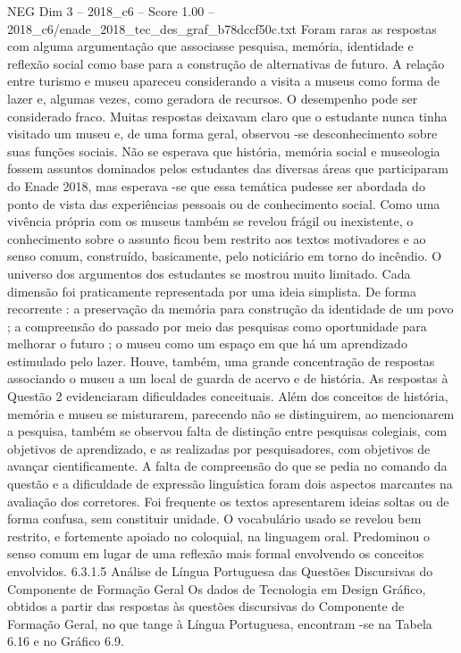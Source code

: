\begin{textsample}{NEG Dim 3 – 2018\_c6 – Score 1.00 – 2018\_c6/enade\_2018\_tec\_des\_graf\_b78dccf50c.txt}
Foram raras as respostas com alguma argumentação que associasse pesquisa, memória, identidade e reflexão social como base para a construção de alternativas de futuro.
A relação entre turismo e museu apareceu considerando a visita a museus como forma de lazer e, algumas vezes, como geradora de recursos.
O desempenho pode ser considerado fraco.
Muitas respostas deixavam claro que o estudante nunca tinha visitado um museu e, de uma forma geral, observou -se desconhecimento sobre suas funções sociais.
Não se esperava que história, memória social e museologia fossem assuntos dominados pelos estudantes das diversas áreas que participaram do Enade 2018, mas esperava -se que essa temática pudesse ser abordada do ponto de vista das experiências pessoais ou de conhecimento social.
Como uma vivência própria com os museus também se revelou frágil ou inexistente, o conhecimento sobre o assunto ficou bem restrito aos textos motivadores e ao senso comum, construído, basicamente, pelo noticiário em torno do incêndio.
O universo dos argumentos dos estudantes se mostrou muito limitado.
Cada dimensão foi praticamente representada por uma ideia simplista.
De forma recorrente : a preservação da memória para construção da identidade de um povo ; a compreensão do passado por meio das pesquisas como oportunidade para melhorar o futuro ; o museu como um espaço em que há um aprendizado estimulado pelo lazer.
Houve, também, uma grande concentração de respostas associando o museu a um local de guarda de acervo e de história.
As respostas à Questão 2 evidenciaram dificuldades conceituais.
Além dos conceitos de história, memória e museu se misturarem, parecendo não se distinguirem, ao mencionarem a pesquisa, também se observou falta de distinção entre pesquisas colegiais, com objetivos de aprendizado, e as realizadas por pesquisadores, com objetivos de avançar cientificamente.
A falta de compreensão do que se pedia no comando da questão e a dificuldade de expressão linguística foram dois aspectos marcantes na avaliação dos corretores.
Foi frequente os textos apresentarem ideias soltas ou de forma confusa, sem constituir unidade.
O vocabulário usado se revelou bem restrito, e fortemente apoiado no coloquial, na linguagem oral.
Predominou o senso comum em lugar de uma reflexão mais formal envolvendo os conceitos envolvidos. 6.3.1.5 Análise de Língua Portuguesa das Questões Discursivas do Componente de Formação Geral Os dados de Tecnologia em Design Gráfico, obtidos a partir das respostas às questões discursivas do Componente de Formação Geral, no que tange à Língua Portuguesa, encontram -se na Tabela 6.16 e no Gráfico 6.9.

\end{textsample}
